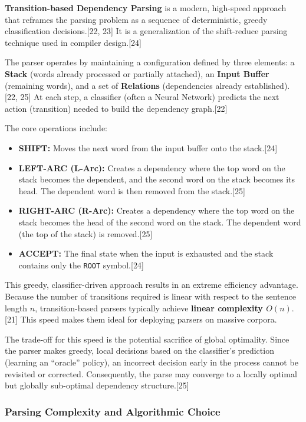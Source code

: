 \documentclass{article}
\begin{document}
\textbf{Transition-based Dependency Parsing} is a modern, high-speed approach that reframes the parsing problem as a sequence of deterministic, greedy classification decisions.[22, 23] It is a generalization of the shift-reduce parsing technique used in compiler design.[24]

The parser operates by maintaining a configuration defined by three elements: a \textbf{Stack} (words already processed or partially attached), an \textbf{Input Buffer} (remaining words), and a set of \textbf{Relations} (dependencies already established).[22, 25] At each step, a classifier (often a Neural Network) predicts the next action (transition) needed to build the dependency graph.[22]

The core operations include:
\begin{itemize}
    \item \textbf{SHIFT:} Moves the next word from the input buffer onto the stack.[24]
    \item \textbf{LEFT-ARC (L-Arc):} Creates a dependency where the top word on the stack becomes the dependent, and the second word on the stack becomes its head. The dependent word is then removed from the stack.[25]
    \item \textbf{RIGHT-ARC (R-Arc):} Creates a dependency where the top word on the stack becomes the head of the second word on the stack. The dependent word (the top of the stack) is removed.[25]
    \item \textbf{ACCEPT:} The final state when the input is exhausted and the stack contains only the \texttt{ROOT} symbol.[24]
\end{itemize}

This greedy, classifier-driven approach results in an extreme efficiency advantage. Because the number of transitions required is linear with respect to the sentence length $n$, transition-based parsers typically achieve \textbf{linear complexity $O(n)$}.[21] This speed makes them ideal for deploying parsers on massive corpora.

The trade-off for this speed is the potential sacrifice of global optimality. Since the parser makes greedy, local decisions based on the classifier's prediction (learning an ``oracle'' policy), an incorrect decision early in the process cannot be revisited or corrected. Consequently, the parse may converge to a locally optimal but globally sub-optimal dependency structure.[25]

\subsubsection{Parsing Complexity and Algorithmic Choice}
\end{document}
